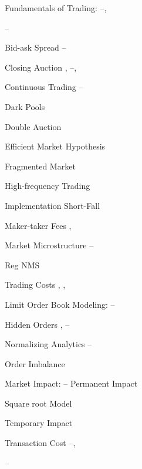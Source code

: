 \begin{multicols}{2}
\noindent Fundamentals of Trading: \hfill \pageref{in:fund_trade1}--\pageref{in:fund_trade2}, \par \hfill \pageref{in:fund_trade3}--\pageref{in:fund_trade4} \par
\twoindent Bid-ask Spread \hfill \pageref{in:bidask1}--\pageref{in:bidask2} \par
\twoindent Closing Auction \hfill \pageref{in:close1}, \pageref{in:close2}--\pageref{in:close3}, \pageref{in:close4} \par
\twoindent Continuous Trading \hfill \pageref{in:cont_trade1}--\pageref{in:cont_trade2} \par
\twoindent Dark Pools \hfill \pageref{in:dark} \par
\twoindent Double Auction \hfill \pageref{in:double} \par
\twoindent Efficient Market Hypothesis \hfill \pageref{in:efficient} \par
\twoindent Fragmented Market \hfill \pageref{in:fragmented} \par
\twoindent High-frequency Trading \hfill \pageref{in:higheff} \par
\twoindent Implementation Short-Fall \hfill \pageref{in:shortfall} \par
\twoindent Maker-taker Fees \hfill \pageref{in:takerfee1}, \pageref{in:takerfee2} \par
\twoindent Market Microstructure \hfill \pageref{in:micro1}--\pageref{in:micro2} \par
\twoindent Reg NMS \hfill \pageref{in:regnms} \par
\twoindent Trading Costs \hfill \pageref{in:tradecost1}, \pageref{in:tradecost2}, \pageref{in:tradecost3} \par
\vspace{\baselineskip}


\noindent Limit Order Book Modeling: \hfill \pageref{in:labmod1}--\pageref{in:labmod2} \par
\twoindent Hidden Orders \hfill \pageref{in:hidden1}, \pageref{in:hidden2}--\pageref{in:hidden3} \par
\twoindent Normalizing Analytics \hfill \pageref{in:norm1}--\pageref{in:norm2} \par
\twoindent Order Imbalance \hfill \pageref{in:imbalance} \par
\vspace{\baselineskip}


\noindent Market Impact: \hfill \pageref{in:impact1}--\pageref{in:impact2}
\twoindent Permanent Impact \hfill \pageref{in:permimp} \par
\twoindent Square root Model \hfill \pageref{in:sqmodel} \par
\twoindent Temporary Impact \hfill \pageref{in:tempimpact} \par
\twoindent Transaction Cost \hfill \pageref{in:transcost1}--\pageref{in:transcost2}, \par \hfill \pageref{in:transcost3}--\pageref{in:transcost4} \par
\vspace{\baselineskip}



\end{multicols}
